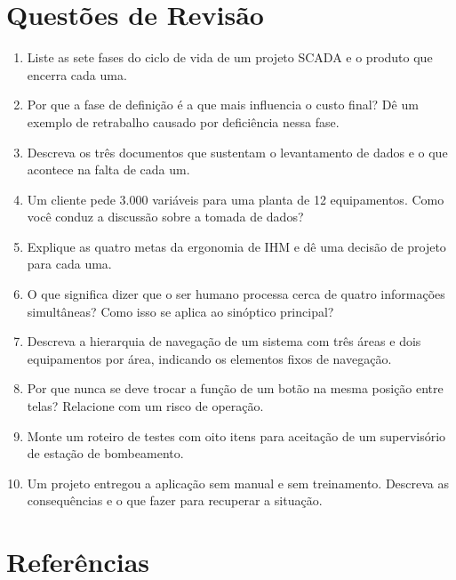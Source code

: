 \section{Questões de Revisão}\label{questuxf5es-de-revisuxe3o}

\begin{enumerate}
\def\labelenumi{\arabic{enumi}.}
\tightlist
\item
  Liste as sete fases do ciclo de vida de um projeto SCADA e o produto que encerra cada uma.
\item
  Por que a fase de definição é a que mais influencia o custo final? Dê um exemplo de retrabalho causado por deficiência nessa fase.
\item
  Descreva os três documentos que sustentam o levantamento de dados e o que acontece na falta de cada um.
\item
  Um cliente pede 3.000 variáveis para uma planta de 12 equipamentos. Como você conduz a discussão sobre a tomada de dados?
\item
  Explique as quatro metas da ergonomia de IHM e dê uma decisão de projeto para cada uma.
\item
  O que significa dizer que o ser humano processa cerca de quatro informações simultâneas? Como isso se aplica ao sinóptico principal?
\item
  Descreva a hierarquia de navegação de um sistema com três áreas e dois equipamentos por área, indicando os elementos fixos de navegação.
\item
  Por que nunca se deve trocar a função de um botão na mesma posição entre telas? Relacione com um risco de operação.
\item
  Monte um roteiro de testes com oito itens para aceitação de um supervisório de estação de bombeamento.
\item
  Um projeto entregou a aplicação sem manual e sem treinamento. Descreva as consequências e o que fazer para recuperar a situação.
\end{enumerate}

\section{Referências}\label{referuxeancias}

